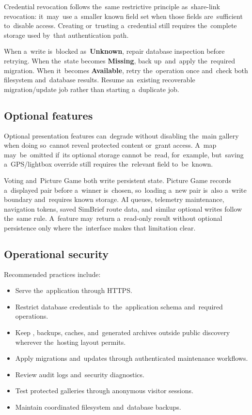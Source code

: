 \documentclass[11pt,a4paper]{article}
\newcommand{\filepath}[1]{\path{#1}}
\newcommand{\ui}[1]{\textbf{#1}}
\begin{document}
Credential revocation follows the~same restrictive principle as~share-link
revocation: it~may~use a~smaller known field set when those fields
are~sufficient to~disable access. Creating or~trusting a~credential still
requires the~complete storage used by~that authentication path.

When a~write is~blocked as~\ui{Unknown}, repair database inspection before
retrying. When the~state becomes \ui{Missing}, back up~and~apply the~required
migration. When it~becomes \ui{Available}, retry the~operation once and~check
both filesystem and~database results. Resume an~existing recoverable
migration/update job rather than starting a~duplicate job.

\subsection{Optional features}

Optional presentation features can~degrade without disabling the~main gallery
when doing so~cannot reveal protected content or~grant access. A~map
may~be~omitted if~its optional storage cannot be~read, for~example, but~saving
a~GPS/lightbox override still requires the~relevant field to~be~known.

Voting and~Picture Game both write persistent state. Picture Game records
a~displayed pair before a~winner is~chosen, so~loading a~new pair is~also
a~write boundary and~requires known storage. AI queues, telemetry maintenance,
navigation tokens, saved SimBrief route data, and~similar optional writes follow
the~same rule. A~feature may~return a~read-only result without optional
persistence only where the~interface makes that limitation clear.

\subsection{Operational security}

Recommended practices include:

\begin{itemize}
  \item Serve the~application through HTTPS.
  \item Restrict database credentials to~the~application schema and~required
  operations.
  \item Keep \filepath{config.php}, backups, caches, and~generated archives
  outside public discovery wherever the~hosting layout permits.
  \item Apply migrations and~updates through authenticated maintenance
  workflows.
  \item Review audit logs and~security diagnostics.
  \item Test protected galleries through anonymous visitor sessions.
  \item Maintain coordinated filesystem and~database backups.
\end{itemize}
\end{document}
